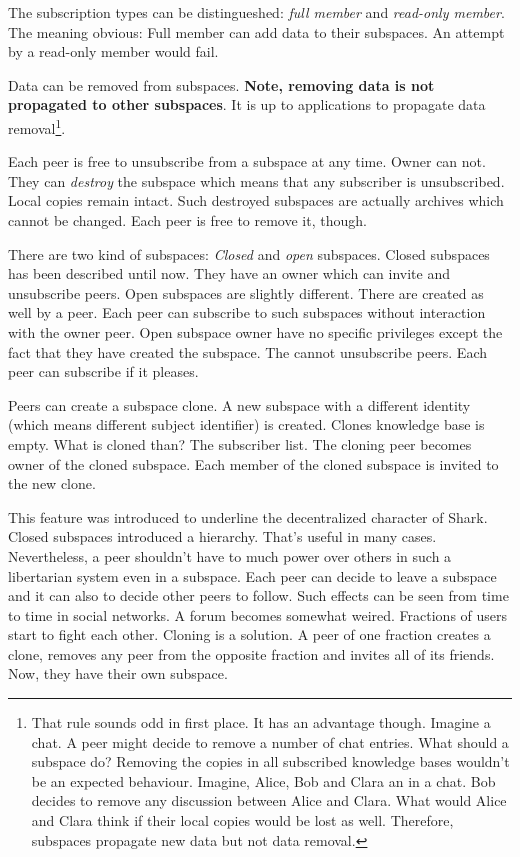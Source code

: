 The subscription types can be distingueshed: {\it full member} and {\it read-only member}. The meaning obvious: Full member can add data to their subspaces. An attempt by a read-only member would fail. 

Data can be removed from subspaces. {\bf Note, removing data is not propagated to other subspaces}. It is up to applications to propagate data removal\footnote{That rule sounds odd in first place. It has an advantage though. Imagine a chat. A peer might decide to remove a number of chat entries. What should a subspace do? Removing the copies in all subscribed knowledge bases wouldn't be an expected behaviour. Imagine, Alice, Bob and Clara an in a chat. Bob decides to remove any discussion between Alice and Clara. What would Alice and Clara think if their local copies would be lost as well. Therefore, subspaces propagate new data but not data removal.}.

Each peer is free to unsubscribe from a subspace at any time. Owner can not. They can {\it destroy} the subspace which means that any subscriber is unsubscribed. Local copies remain intact. Such destroyed subspaces are actually
archives which cannot be changed. Each peer is free to remove it, though.

There are two kind of subspaces: {\it Closed} and {\it open} subspaces. Closed subspaces has been described until now. They have an owner which can invite and unsubscribe peers. Open subspaces are slightly different. There are created as well by a peer. Each peer can subscribe to such subspaces without interaction with the owner peer. Open subspace owner have no specific privileges except the fact that they have created the subspace. The cannot unsubscribe peers. Each peer can subscribe if it pleases.

Peers can create a subspace clone. A new subspace with a different identity (which means different subject identifier) is created. Clones knowledge base is empty. What is cloned than? The subscriber list. The cloning peer becomes owner of the cloned subspace. Each member of the cloned subspace is invited to the new clone. 

This feature was introduced to underline the decentralized character of Shark. Closed subspaces introduced a hierarchy. That's useful in many cases. Nevertheless, a peer shouldn't have to much power over others in such a libertarian system even in a subspace. Each peer can decide to leave a subspace and it can also to decide other peers to follow. Such effects can be seen from time to time in social networks. A forum becomes somewhat weired. Fractions of users start to fight each other. Cloning is a solution. A peer of one fraction creates a clone, removes any peer from the opposite fraction and invites all of its friends. Now, they have their own subspace.

